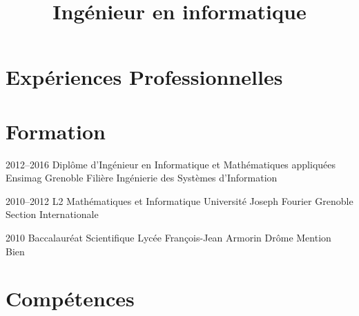 \documentclass[11pt,a4paper,sans]{moderncv} %
\title{Ingénieur en informatique}
\title{}
\begin{document}
\makecvtitle %
\vspace*{-0.75cm}


\section{Expériences Professionnelles}










\section{Formation}
\cventry
    {2012--2016}
    {Diplôme d'Ingénieur en Informatique et Mathématiques appliquées}
    {}
    {Ensimag}
    {Grenoble}
    {Filière Ingénierie des Systèmes d'Information}
    
\cventry
    {2010--2012}
    {L2 Mathématiques et Informatique}
    {}
    {Université Joseph Fourier}
    {Grenoble}
    {Section Internationale}
    
\cventry
    {2010}
    {Baccalauréat Scientifique}
    {}
    {Lycée François-Jean Armorin}
    {Drôme}
    {Mention Bien}


\section{Compétences}

\end{document}
